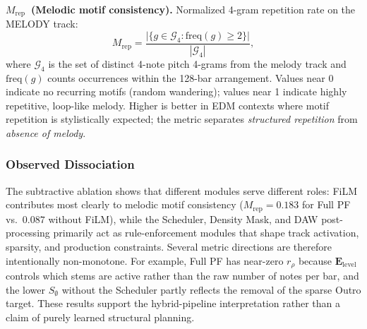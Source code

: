 \documentclass[pdflatex,sn-mathphys-num,twocolumn]{sn-jnl}
\theoremstyle{thmstyleone}
\theoremstyle{thmstyletwo}
\begin{document}
\noindent\textbf{$M_\mathrm{rep}$~(Melodic motif consistency).}
Normalized 4-gram repetition rate on the MELODY track:
\begin{equation}\label{eq:mrep}
  M_\mathrm{rep}
  = \frac{\bigl|\bigl\{g \in \mathcal{G}_4 : \mathrm{freq}(g)\geq 2\bigr\}\bigr|}
         {|\mathcal{G}_4|},
\end{equation}
where $\mathcal{G}_4$ is the set of distinct 4-note pitch 4-grams from the
melody track and $\mathrm{freq}(g)$ counts occurrences within the 128-bar
arrangement.  Values near 0 indicate no recurring motifs (random wandering);
values near 1 indicate highly repetitive, loop-like melody.
Higher is better in EDM contexts where motif repetition is stylistically
expected; the metric separates \emph{structured repetition} from
\emph{absence of melody}.

\subsubsection*{Observed Dissociation}

The subtractive ablation shows that different modules serve different roles:
FiLM contributes most clearly to melodic motif consistency ($M_\mathrm{rep}=0.183$
for Full PF vs.\ $0.087$ without FiLM), while the Scheduler, Density Mask, and
DAW post-processing primarily act as rule-enforcement modules that shape track
activation, sparsity, and production constraints.
Several metric directions are therefore intentionally non-monotone.
For example, Full PF has near-zero $r_\rho$ because $\mathbf{E}_\mathrm{level}$
controls which stems are active rather than the raw number of notes per bar, and
the lower $S_\emptyset$ without the Scheduler partly reflects the removal of the
sparse Outro target.
These results support the hybrid-pipeline interpretation rather than a claim of
purely learned structural planning.
\end{document}
